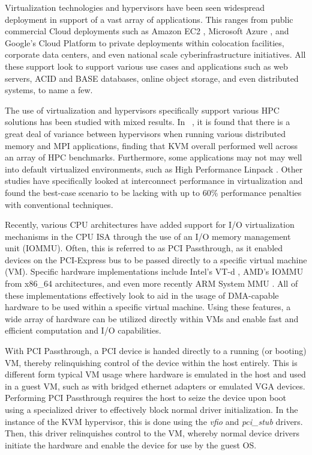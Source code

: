 \documentclass{sigplanconf}
\begin{document}
Virtualization technologies and hypervisors have been seen widespread deployment in support of a vast array of applications.  This ranges from public commercial Cloud deployments such as Amazon EC2 \cite{hazelhurst2008scientific,amazon2010}, Microsoft Azure \cite{jennings2010cloud}, and Google's Cloud Platform \cite{www-google-platform} to private deployments within colocation facilities, corporate data centers, and even national scale cyberinfrastructure initiatives.  All these support look to support various use cases and applications such as web servers, ACID and BASE databases, online object storage, and even distributed systems, to name a few.  

The use of virtualization and hypervisors specifically support various HPC solutions has been studied with mixed results.  In ~\cite{Younge2011cloud}, it is found that there is a great deal of variance between hypervisors when running various distributed memory and MPI applications, finding that KVM overall performed well across an array of HPC benchmarks.  Furthermore, some applications may not may well into default virtualized environments, such as High Performance Linpack \cite{Luszczek:2011:EHC}. Other studies have specifically looked at interconnect performance in virtualization and found the best-case scenario to be lacking \cite{Ramakrishnan2012} with up to 60\% performance penalties with conventional techniques.
 
Recently, various CPU architectures have added support for I/O virtualization mechanisms in the CPU ISA through the use of an I/O memory management unit (IOMMU). Often, this is referred to as PCI Passthrough, as it enabled devices on the PCI-Express bus to be passed directly to a specific virtual machine (VM).  Specific hardware implementations include Intel's VT-d \cite{intelvirtualization}, AMD's IOMMU \cite{amdiommu} from x86\_64 architectures, and even more recently ARM System MMU \cite{armmmu}.  All of these implementations effectively look to aid in the usage of DMA-capable hardware to be used within a specific virtual machine. Using these features, a wide array of hardware can be utilized directly within VMs and enable fast and efficient computation and I/O capabilities.

With PCI Passthrough, a PCI device is handed directly to a running (or booting) VM, thereby relinquishing control of the device within the host entirely. This is different form typical VM usage where hardware is emulated in the host and used in a guest VM, such as with bridged ethernet adapters or emulated VGA devices. Performing PCI Passthrough requires the host to seize the device upon boot using a specialized driver to effectively block normal driver initialization. In the instance of the KVM hypervisor, this is done using the \emph{vfio} and \emph{pci\_stub} drivers. Then, this driver relinquishes control to the VM, whereby normal device drivers initiate the hardware and enable the device for use by the guest OS.  
\end{document}
